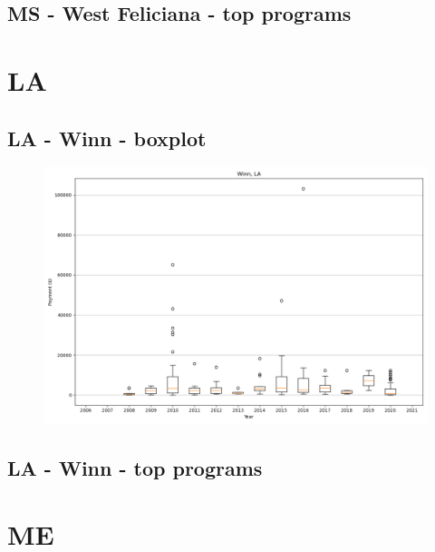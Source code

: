 \subsection*{MS - West Feliciana - top programs}

\newpage
\section*{LA}
\subsection*{LA - Winn - boxplot}
\begin{figure}[h]
\centering
\includegraphics[width=7in]{../output/boxplots/counties/Winn-LA_boxplot.png}
\end{figure}


\subsection*{LA - Winn - top programs}

\newpage
\section*{ME}
